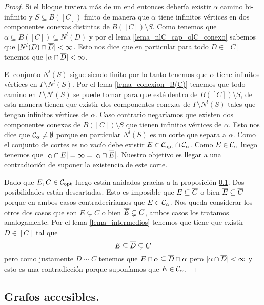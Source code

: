 \documentclass[tesis.tex]{subfiles}
\begin{document}
\begin{proof}
	Si el bloque tuviera más de un end entonces debería existir $\alpha$ camino bi-infinito y $S \subseteq B([C])$ finito de manera que $\alpha$ tiene infinitos vértices en dos componentes conexas distintas de $B([C]) \setminus S$.
	Como tenemos que $\alpha \subseteq B([C]) \subseteq N^l(D)$ y por el lema \ref{lema_nlC_cap_olC_conexo} sabemos que $|N^l(D) \cap \overline D | < \infty$.
	Esto nos dice que en particular para todo $D \in [C]$ tenemos que $|\alpha \cap \overline D| < \infty$.
	
	El conjunto $N^l(S)$ sigue siendo finito por lo tanto tenemos que $\alpha$ tiene infinitos vértices en $\Gamma \setminus N^l(S)$.
	Por el lema \ref{lema_conexion_B(C)} tenemos que todo camino en $\Gamma \setminus N^l(S)$ se puede tomar para que esté dentro de $B([C]) \setminus S$, de esta manera tienen que existir dos componentes conexas de $\Gamma \setminus N^l(S)$ tales que tengan infinitos vértices de $\alpha$. 
	Caso contrario negaríamos que existen dos componentes conexas de $B([C]) \setminus S$ que tienen infinitos vértices de $\alpha$.
	Esto nos dice que ${\cal C}_{\alpha} \neq \emptyset$ porque en particular $N^l(S)$ es un corte que separa a $\alpha$.
	Como el conjunto de cortes es no vacío debe existir $E \in {\cal C}_{\text{opt}} \cap {\cal C}_{\alpha}$.
	Como $E \in {\cal C}_{\alpha}$ luego tenemos que $|\alpha \cap E| = \infty = |\alpha \cap \overline E|$.
	Nuestro objetivo es llegar a una contradicción de suponer la existencia de este corte. 	
	
	Dado que $E,C \in {\cal C}_{\text{opt}}$ luego están anidados gracias a la proposición \ref{}.
	Dos posibilidades están descartadas. 
	Esto es imposible que $E \subseteq \overline C$ o bien $\overline E \subseteq \overline C$ porque en ambos casos contradeciríamos que $E \in {\cal C}_{\alpha}$.
	Nos queda considerar los otros dos casos que son $E \subsetneq C$ o bien $\overline E \subsetneq C$, ambos casos los tratamos analogamente.
	Por el lema \ref{lema_intermedios} tenemos que tiene que existir $D \in [C]$ tal que 
	\[
		E \subseteq \overline D \subsetneq C
	\]
	pero como justamente $D \sim C$ tenemos que $E \cap \alpha \subseteq \overline D \cap \alpha$ pero $|\alpha \cap \overline D| < \infty$ y esto es una contradicción porque suponíamos que $E \in {\cal C}_{\alpha}$.
\end{proof}



\subsection{Grafos accesibles.}
\end{document}
